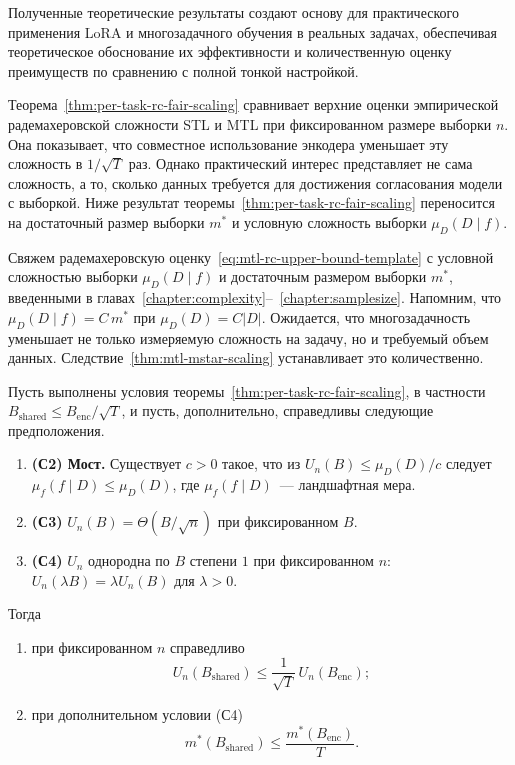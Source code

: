 Полученные теоретические результаты создают основу для практического применения LoRA и многозадачного обучения в реальных задачах, обеспечивая теоретическое обоснование их эффективности и количественную оценку преимуществ по сравнению с полной тонкой настройкой.

Теорема~\ref{thm:per-task-rc-fair-scaling} сравнивает верхние оценки эмпирической радемахеровской сложности STL и MTL при фиксированном размере выборки $n$.
Она показывает, что совместное использование энкодера уменьшает эту сложность в $1/\sqrt{T}$ раз.
Однако практический интерес представляет не сама сложность, а то, сколько данных требуется для достижения согласования модели с выборкой.
Ниже результат теоремы~\ref{thm:per-task-rc-fair-scaling} переносится на достаточный размер выборки $m^*$ и условную сложность выборки $\mu_D(D\mid f)$.

Свяжем радемахеровскую оценку~\eqref{eq:mtl-rc-upper-bound-template} с условной сложностью выборки $\mu_D(D\mid f)$ и достаточным размером выборки $m^*$, введенными в главах~\ref{chapter:complexity}--~\ref{chapter:samplesize}.
Напомним, что $\mu_D(D\mid f)=C\,m^*$ при $\mu_D(D)=C\lvert D\rvert$.
Ожидается, что многозадачность уменьшает не только измеряемую сложность на задачу, но и требуемый объем данных.
Следствие~\ref{thm:mtl-mstar-scaling} устанавливает это количественно.

\begin{corollary}\label{thm:mtl-mstar-scaling}
Пусть выполнены условия теоремы~\ref{thm:per-task-rc-fair-scaling}, в частности $B_{\mathrm{shared}}\le B_{\mathrm{enc}}/\sqrt{T}$, и пусть, дополнительно, справедливы следующие предположения.
\begin{enumerate}[1)]
\item \textbf{(С2) Мост.} Существует $c>0$ такое, что из $U_n(B)\le\mu_D(D)/c$ следует $\mu_f(f\mid D)\le\mu_D(D)$, где $\mu_f(f\mid D)$~--- ландшафтная мера.
\item \textbf{(С3)} $U_n(B)=\Theta(B/\sqrt{n})$ при фиксированном $B$.
\item \textbf{(С4)} $U_n$ однородна по $B$ степени $1$ при фиксированном $n$: $U_n(\lambda B)=\lambda U_n(B)$ для $\lambda>0$.
\end{enumerate}
Тогда
\begin{enumerate}[1)]
\item при фиксированном $n$ справедливо
\begin{equation}\label{ch5:eq:mtl-rc-scaling}
  U_n(B_{\mathrm{shared}})\le\frac{1}{\sqrt{T}}\,U_n(B_{\mathrm{enc}}) ;
\end{equation}
\item при дополнительном условии (С4)
\begin{equation}\label{ch5:eq:mtl-mstar-scaling}
  m^*(B_{\mathrm{shared}})\le\frac{m^*(B_{\mathrm{enc}})}{T} .
\end{equation}
\end{enumerate}
\end{corollary}

